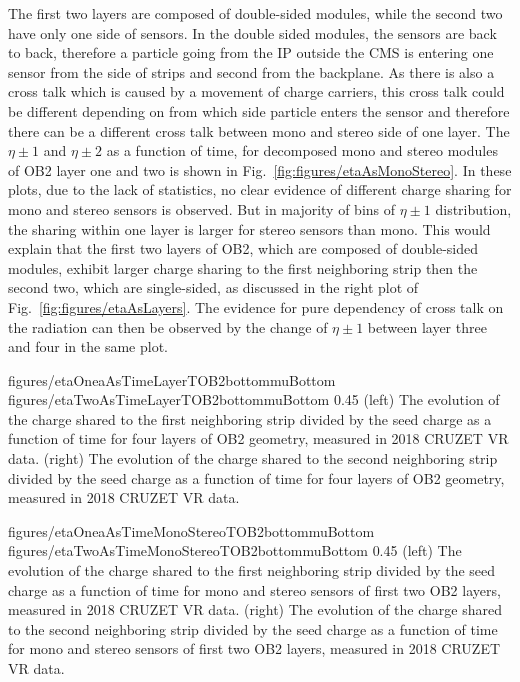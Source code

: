 The first two layers are composed of double-sided modules, while the second two have only one side of sensors. In the double sided modules, the sensors are back to back, therefore a particle going from the IP outside the CMS is entering one sensor from the side of strips and second from the backplane. As there is also a cross talk which is caused by a movement of charge carriers, this cross talk could be different depending on from which side particle enters the sensor and therefore there can be a different cross talk between mono and stereo side of one layer. The $\eta \pm 1$ and $\eta \pm 2$ as a function of time, for decomposed mono and stereo modules of OB2 layer one and two is shown in Fig.~\ref{fig:figures/etaAsMonoStereo}. In these plots, due to the lack of statistics, no clear evidence of different charge sharing for mono and stereo sensors is observed. But in majority of bins of $\eta \pm 1$ distribution, the sharing within one layer is larger for stereo sensors than mono. This would explain that the first two layers of OB2, which are composed of double-sided modules, exhibit larger charge sharing to the first neighboring strip then the second two, which are single-sided, as discussed in the right plot of Fig.~\ref{fig:figures/etaAsLayers}. The evidence for pure dependency of cross talk on the radiation can then be observed by the change of $\eta \pm 1$ between layer three and four in the same plot.


                 {figures/etaOneaAsTimeLayerTOB2bottommuBottom}
                 {figures/etaTwoAsTimeLayerTOB2bottommuBottom} %
                 {0.45}       %
                 {(left) The evolution of the charge shared to the first neighboring strip divided by the seed charge as a function of time for four layers of OB2 geometry, measured in 2018 CRUZET VR data.  (right) The evolution of the charge shared to the second neighboring strip divided by the seed charge as a function of time for four layers of OB2 geometry, measured in 2018 CRUZET VR data. }


                 {figures/etaOneaAsTimeMonoStereoTOB2bottommuBottom}
                 {figures/etaTwoAsTimeMonoStereoTOB2bottommuBottom} %
                 {0.45}       %
                 {(left) The evolution of the charge shared to the first neighboring strip divided by the seed charge as a function of time for mono and stereo sensors of first two OB2 layers, measured in 2018 CRUZET VR data.  (right) The evolution of the charge shared to the second neighboring strip divided by the seed charge as a function of time for mono and stereo sensors of first two OB2 layers, measured in 2018 CRUZET VR data. }



